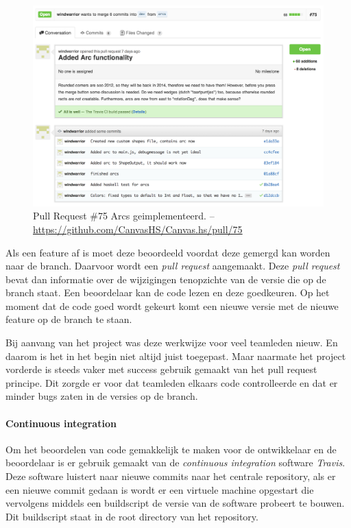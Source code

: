 \begin{figure}
\begin{center}
\includegraphics[keepaspectratio,width=\textwidth]{./images/pullrequest.png}
\caption{Pull Request \#75 Arcs geimplementeerd. – \url{https://github.com/CanvasHS/Canvas.hs/pull/75}}
\label{fig:pullrequest}
\end{center}
\end{figure}

Als een feature af is moet deze beoordeeld voordat deze gemergd kan worden naar de  branch. Daarvoor wordt een \emph{pull request} aangemaakt. Deze \emph{pull request} bevat dan informatie over de wijzigingen tenopzichte van de versie die op de  branch staat. Een beoordelaar kan de code lezen en deze goedkeuren. Op het moment dat de code goed wordt gekeurt komt een nieuwe versie met de nieuwe feature op de  branch te staan.

Bij aanvang van het project was deze werkwijze voor veel teamleden nieuw. En daarom is het in het begin niet altijd juist toegepast. Maar naarmate het project vorderde is steeds vaker met success gebruik gemaakt van het pull request principe. Dit zorgde er voor dat teamleden elkaars code controlleerde en dat er minder bugs zaten in de versies op de  branch.

\paragraph{Continuous integration} Om het beoordelen van code gemakkelijk te maken voor de ontwikkelaar en de beoordelaar is er gebruik gemaakt van de \emph{continuous integration} software \emph{Travis}. Deze software luistert naar nieuwe commits naar het centrale repository, als er een nieuwe commit gedaan is wordt er een virtuele machine opgestart die vervolgens middels een buildscript de versie van de software probeert te bouwen. Dit buildscript staat in de root directory van het repository. 


